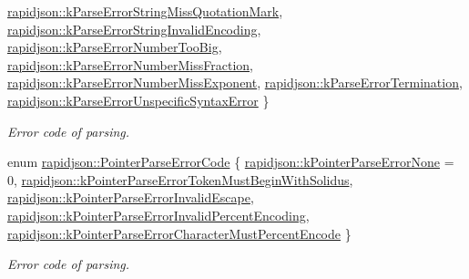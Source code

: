 \begin{DoxyCompactItemize}
\mbox{\hyperlink{group___r_a_p_i_d_j_s_o_n___e_r_r_o_r_s_gga7d3acf640886b1f2552dc8c4cd6dea60af7daa91caa53abb881ea231a874a4f40}{rapidjson\+::k\+Parse\+Error\+String\+Miss\+Quotation\+Mark}}, 
\newline
\mbox{\hyperlink{group___r_a_p_i_d_j_s_o_n___e_r_r_o_r_s_gga7d3acf640886b1f2552dc8c4cd6dea60a62ce0f5c74e4ab34ac325d2adda8fa8f}{rapidjson\+::k\+Parse\+Error\+String\+Invalid\+Encoding}}, 
\mbox{\hyperlink{group___r_a_p_i_d_j_s_o_n___e_r_r_o_r_s_gga7d3acf640886b1f2552dc8c4cd6dea60a240cebadea89f7282ab263b5a22c9805}{rapidjson\+::k\+Parse\+Error\+Number\+Too\+Big}}, 
\mbox{\hyperlink{group___r_a_p_i_d_j_s_o_n___e_r_r_o_r_s_gga7d3acf640886b1f2552dc8c4cd6dea60ac840ece3ba6874fe6f16c01ebb71031f}{rapidjson\+::k\+Parse\+Error\+Number\+Miss\+Fraction}}, 
\mbox{\hyperlink{group___r_a_p_i_d_j_s_o_n___e_r_r_o_r_s_gga7d3acf640886b1f2552dc8c4cd6dea60a28a1c720ae63560780ccd992dc999ab7}{rapidjson\+::k\+Parse\+Error\+Number\+Miss\+Exponent}}, 
\newline
\mbox{\hyperlink{group___r_a_p_i_d_j_s_o_n___e_r_r_o_r_s_gga7d3acf640886b1f2552dc8c4cd6dea60ab250f87c3d8454c579364b5a0f697a50}{rapidjson\+::k\+Parse\+Error\+Termination}}, 
\mbox{\hyperlink{group___r_a_p_i_d_j_s_o_n___e_r_r_o_r_s_gga7d3acf640886b1f2552dc8c4cd6dea60a7abf1a337294d984a3f4d18b5843fb24}{rapidjson\+::k\+Parse\+Error\+Unspecific\+Syntax\+Error}}
 \}
\begin{DoxyCompactList}\small\item\em Error code of parsing. \end{DoxyCompactList}\item 
enum \mbox{\hyperlink{group___r_a_p_i_d_j_s_o_n___e_r_r_o_r_s_gade540ee4cc2a416c23b8ee2c12393c7b}{rapidjson\+::\+Pointer\+Parse\+Error\+Code}} \{ \newline
\mbox{\hyperlink{group___r_a_p_i_d_j_s_o_n___e_r_r_o_r_s_ggade540ee4cc2a416c23b8ee2c12393c7ba9094f236b2ec70c42f1ea91dffc1e39b}{rapidjson\+::k\+Pointer\+Parse\+Error\+None}} = 0, 
\mbox{\hyperlink{group___r_a_p_i_d_j_s_o_n___e_r_r_o_r_s_ggade540ee4cc2a416c23b8ee2c12393c7ba2f2f8b238e201b7d540e8914bbfd2bed}{rapidjson\+::k\+Pointer\+Parse\+Error\+Token\+Must\+Begin\+With\+Solidus}}, 
\mbox{\hyperlink{group___r_a_p_i_d_j_s_o_n___e_r_r_o_r_s_ggade540ee4cc2a416c23b8ee2c12393c7ba907c9fe4e541b257513e3a18635379f7}{rapidjson\+::k\+Pointer\+Parse\+Error\+Invalid\+Escape}}, 
\mbox{\hyperlink{group___r_a_p_i_d_j_s_o_n___e_r_r_o_r_s_ggade540ee4cc2a416c23b8ee2c12393c7ba29831a02b8ee23a05d552b47f4d64d28}{rapidjson\+::k\+Pointer\+Parse\+Error\+Invalid\+Percent\+Encoding}}, 
\newline
\mbox{\hyperlink{group___r_a_p_i_d_j_s_o_n___e_r_r_o_r_s_ggade540ee4cc2a416c23b8ee2c12393c7bae244a98f53279fda5a750f847b81c54f}{rapidjson\+::k\+Pointer\+Parse\+Error\+Character\+Must\+Percent\+Encode}}
 \}
\begin{DoxyCompactList}\small\item\em Error code of parsing. \end{DoxyCompactList}\end{DoxyCompactItemize}
